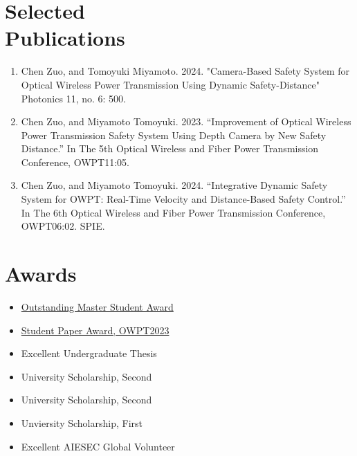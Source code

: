 \documentclass{mycv}
\begin{document}
\section{Selected \\ Publications}
\begin{enumerate}
	\item  Chen Zuo, and Tomoyuki Miyamoto. 2024. "Camera-Based Safety System for Optical Wireless Power Transmission Using Dynamic Safety-Distance" Photonics 11, no. 6: 500.
	\item  Chen Zuo, and Miyamoto Tomoyuki. 2023. “Improvement of Optical Wireless Power Transmission Safety System Using Depth Camera by New Safety Distance.” In The 5th Optical Wireless and Fiber Power Transmission Conference, OWPT11:05.
	\item Chen Zuo, and Miyamoto Tomoyuki. 2024. “Integrative Dynamic Safety System for OWPT: Real-Time Velocity and Distance-Based Safety Control.” In The 6th Optical Wireless and Fiber Power Transmission Conference, OWPT06:02. SPIE.
\end{enumerate}



\section{Awards}

\begin{itemize}
  \item \href{https://educ.titech.ac.jp/ee/eng/news/2024_04/065884.html}{Outstanding Master Student Award} 
  \item \href{https://www.first.iir.titech.ac.jp/news/2023/detail_1455.html}{Student Paper Award, OWPT2023} 
  \item Excellent Undergraduate Thesis 
  \item University Scholarship, Second 
  \item University Scholarship, Second 
  \item Unviersity Scholarship, First 
  \item Excellent AIESEC Global Volunteer 
\end{itemize}
\end{document}
